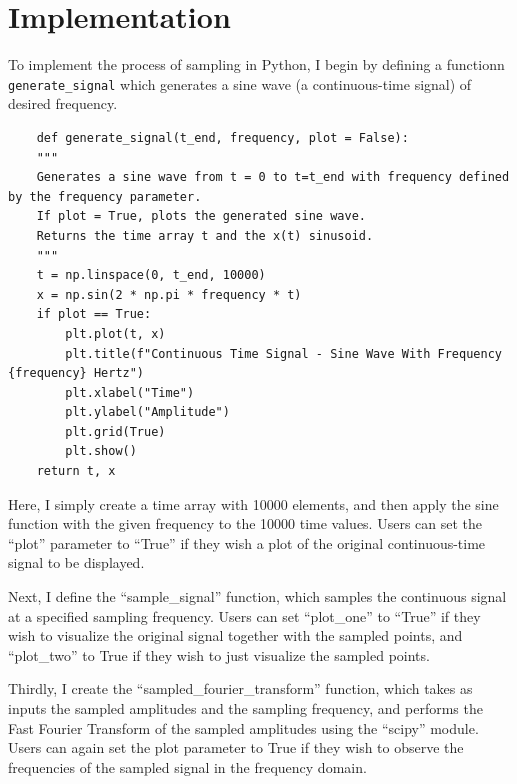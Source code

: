 \documentclass{article}
\begin{document}
\section{Implementation}
To implement the process of sampling in Python, I begin by defining a functionn \verb|generate_signal| which generates a sine wave (a continuous-time signal) of desired frequency.
\begin{verbatim}
    def generate_signal(t_end, frequency, plot = False):
    """
    Generates a sine wave from t = 0 to t=t_end with frequency defined by the frequency parameter.
    If plot = True, plots the generated sine wave.
    Returns the time array t and the x(t) sinusoid.
    """
    t = np.linspace(0, t_end, 10000)
    x = np.sin(2 * np.pi * frequency * t)
    if plot == True:
        plt.plot(t, x)
        plt.title(f"Continuous Time Signal - Sine Wave With Frequency {frequency} Hertz")
        plt.xlabel("Time")
        plt.ylabel("Amplitude")
        plt.grid(True)
        plt.show()
    return t, x
\end{verbatim}
Here, I simply create a time array with 10000 elements, and then apply the sine function with the given frequency to the 10000 time values. 
Users can set the ``plot'' parameter to ``True'' if they wish a plot of the original continuous-time signal to be displayed.

Next, I define the ``sample\_signal'' function, which samples the continuous signal at a specified sampling frequency.
Users can set ``plot\_one'' to ``True'' if they wish to visualize the original signal together with the sampled points, and ``plot\_two'' to True if they wish to just visualize the sampled points.

Thirdly, I create the ``sampled\_fourier\_transform'' function, which takes as inputs the sampled amplitudes and the sampling frequency, and performs the Fast Fourier Transform of the sampled amplitudes using the ``scipy'' module. %
Users can again set the plot parameter to True if they wish to observe the frequencies of the sampled signal in the frequency domain. %
\end{document}
